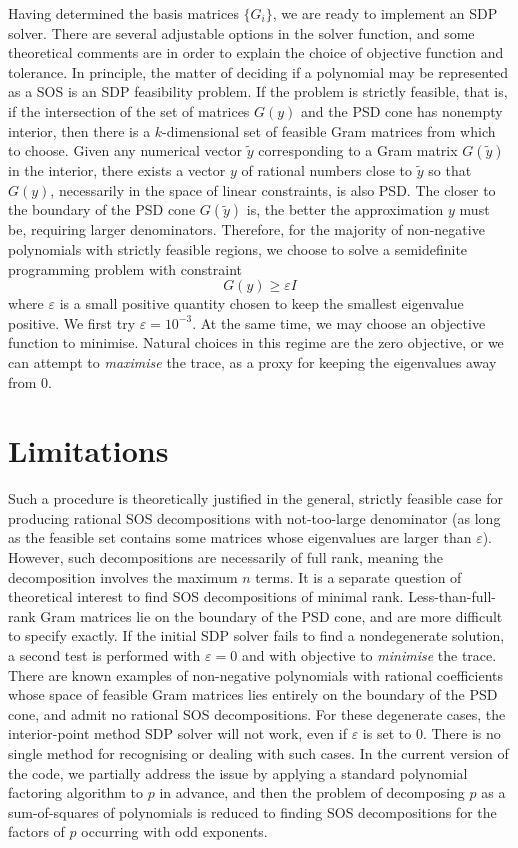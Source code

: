 \documentclass[oneside, 10pt]{amsart}
\begin{document}
    Having determined the basis matrices $\{G_i\}$, we are ready to implement an SDP solver. There are several adjustable options in the solver function, and some theoretical comments are in order to explain the choice of objective function and tolerance. In principle, the matter of deciding if a polynomial may be represented as a SOS is an SDP feasibility problem. If the problem is strictly feasible, that is, if the intersection of the set of matrices $G(y)$ and the PSD cone has nonempty interior, then there is a $k$-dimensional set of feasible Gram matrices from which to choose. Given any numerical vector $\tilde{y}$ corresponding to a Gram matrix $G(\tilde{y})$ in the interior, there exists a vector $y$ of rational numbers close to $\tilde{y}$ so that $G(y)$, necessarily in the space of linear constraints, is also PSD. The closer to the boundary of the PSD cone $G(\tilde{y})$ is, the better the approximation $y$ must be, requiring larger denominators. Therefore, for the majority of non-negative polynomials with strictly feasible regions, we choose to solve a semidefinite programming problem with constraint
    \begin{equation}
        G(y) \geq \varepsilon I
    \end{equation}
    where $\varepsilon$ is a small positive quantity chosen to keep the smallest eigenvalue positive. We first try $\varepsilon = 10^{-3}$. At the same time, we may choose an objective function to minimise. Natural choices in this regime are the zero objective, or we can attempt to \emph{maximise} the trace, as a proxy for keeping the eigenvalues away from $0$.

    \section{Limitations}
    Such a procedure is theoretically justified in the general, strictly feasible case for producing rational SOS decompositions with not-too-large denominator (as long as the feasible set contains some matrices whose eigenvalues are larger than $\varepsilon$). However, such decompositions are necessarily of full rank, meaning the decomposition involves the maximum $n$ terms. It is a separate question of theoretical interest to find SOS decompositions of minimal rank. Less-than-full-rank Gram matrices lie on the boundary of the PSD cone, and are more difficult to specify exactly. If the initial SDP solver fails to find a nondegenerate solution, a second test is performed with $\varepsilon=0$ and with objective to \emph{minimise} the trace. There are known examples of non-negative polynomials with rational coefficients whose space of feasible Gram matrices lies entirely on the boundary of the PSD cone, and admit no rational SOS decompositions. For these degenerate cases, the interior-point method SDP solver will not work, even if $\varepsilon$ is set to $0$. There is no single method for recognising or dealing with such cases. In the current version of the code, we partially address the issue by applying a standard polynomial factoring algorithm to $p$ in advance, and then the problem of decomposing $p$ as a sum-of-squares of polynomials is reduced to finding SOS decompositions for the factors of $p$ occurring with odd exponents.
\end{document}
